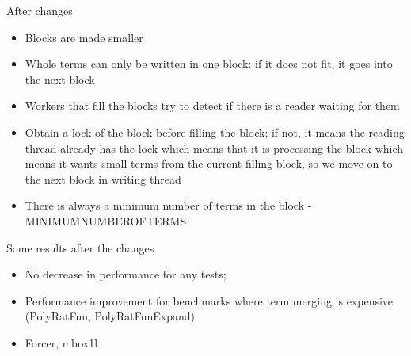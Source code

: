 \documentclass[11pt]{beamer}
\begin{document}
\begin{frame}
After changes
\begin{itemize}
\item Blocks are made smaller
\item Whole terms can only be written in one block: if it does not fit, it goes into the next block
\item Workers that fill the blocks try to detect if there is a reader waiting for them
\item Obtain a lock of the block before filling the block; if not, it means the reading thread already has the lock which means that it is processing the block which means it wants small terms from the current filling block, so we move on to the next block in writing thread
\item There is always a minimum number of terms in the block - MINIMUMNUMBEROFTERMS
\end{itemize}
\end{frame}

















\begin{frame}
Some results after the changes
\begin{itemize}
\item No decrease in performance for any tests;
\item Performance improvement for benchmarks where term merging is expensive (PolyRatFun, PolyRatFunExpand)
\item Forcer, mbox1l
\end{itemize}
\end{frame}
\end{document}
